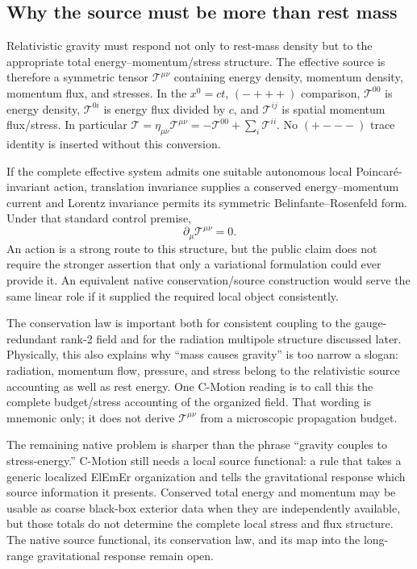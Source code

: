\documentclass[11pt]{article}
\newcommand{\cmotion}{\mbox{C-Motion}}
\newcommand{\ElEmEr}{\mbox{ElEmEr}}
\theoremstyle{plain}
\theoremstyle{remark}
\begin{document}
\subsection{Why the source must be more than rest mass}
\label{sec:source}

Relativistic gravity must respond not only to rest-mass density but to the appropriate
total energy--momentum/stress structure.  The effective source is therefore a symmetric
tensor $\mathcal T^{\mu\nu}$ containing energy density, momentum density, momentum flux,
and stresses.  In the $x^0=ct$, $(-+++)$ comparison,
$\mathcal T^{00}$ is energy density,
$\mathcal T^{0i}$ is energy flux divided by $c$, and
$\mathcal T^{ij}$ is spatial momentum flux/stress.  In particular
$\mathcal T=\eta_{\mu\nu}\mathcal T^{\mu\nu}
=-\mathcal T^{00}+\sum_i\mathcal T^{ii}$.
No $(+---)$ trace identity is inserted without this conversion.

If the complete effective system admits one suitable autonomous local Poincar\'e-invariant
action, translation invariance supplies a conserved energy--momentum current and Lorentz
invariance permits its symmetric Belinfante--Rosenfeld form.  Under that standard control
premise,
\begin{equation}
\partial_\mu \mathcal T^{\mu\nu}=0.
\label{eq:source-conservation}
\end{equation}
An action is a strong route to this structure, but the public claim does not require the
stronger assertion that only a variational formulation could ever provide it.  An equivalent
native conservation/source construction would serve the same linear role if it supplied the
required local object consistently.

The conservation law is important both for consistent coupling to the gauge-redundant
rank-2 field and for the radiation multipole structure discussed later.  Physically, this
also explains why ``mass causes gravity'' is too narrow a slogan: radiation, momentum
flow, pressure, and stress belong to the relativistic source accounting as well as rest
energy.  One \cmotion{} reading is to call this the complete budget/stress accounting of
the organized field.  That wording is mnemonic only; it does not derive
$\mathcal T^{\mu\nu}$ from a microscopic propagation budget.

The remaining native problem is sharper than the phrase ``gravity couples to stress-energy.''
\cmotion{} still needs a local source functional: a rule that takes a generic localized
\ElEmEr{} organization and tells the gravitational response which source information it
presents.  Conserved total energy and momentum may be usable as coarse black-box exterior data
when they are independently available, but those totals do not determine the complete local
stress and flux structure.  The native source functional, its conservation law, and its map
into the long-range gravitational response remain open.
\end{document}
